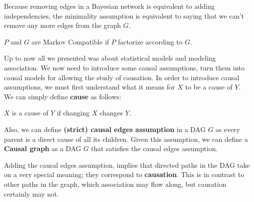 Because removing edges in a Bayesian network is equivalent to adding
independencies, the minimality assumption is equivalent to saying that we can't
remove any more edges from the graph $G$.

\begin{definition}
    $P$ and $G$ are Markov Compatible if $P$ factorize according to $G$.
\end{definition}

Up to now all we presented was about statistical models and modeling association.
We now need to introduce some causal assumptions, turn them into causal models
for allowing the study of causation. In order to introduce causal assumptions,
we must first understand what it means for $X$ to be a cause of $Y$. We can simply
define \textbf{cause} as follows:
\begin{definition}
    $X$ is a cause of $Y$ if changing $X$ changes $Y$.
\end{definition}

Also, we can define \textbf{(strict) causal edges assumption} in a DAG $G$ as every parent
is a direct cause of all its children. Given this assumption, we can define a
\textbf{Causal graph} as a DAG $G$ that satisfies the causal edges assumption.

Adding the causal edges assumption, implies that directed paths in the DAG take
on a very special meaning; they correspond to \textbf{causation}. This is in
contrast to other paths in the graph, which association may flow along, but
causation certainly may not.
